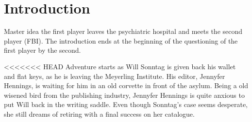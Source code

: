 \section{Introduction}

Master idea
the first player leaves the psychiatric hospital and meets the second player
(FBI). The introduction ends at the beginning of the questioning of the first
player by the second.

<<<<<<< HEAD
Adventure starts as Will Sonntag is given back his wallet and flat keys, as he
is leaving the Meyerling Institute. His editor, Jennyfer Hennings, is waiting for him in an
old corvette in front of the asylum. Being a old wisened bird from the
publishing industry, Jennyfer Hennings is quite anxious to put Will back in the writing
saddle. Even though Sonntag's case seems desperate, she still dreams of
retiring with a final success on her catalogue.

